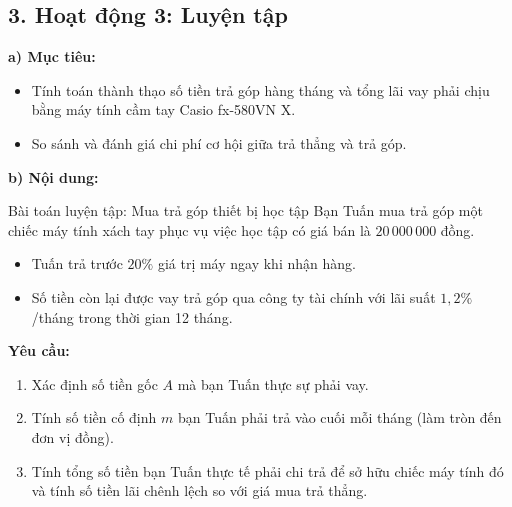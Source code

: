 \documentclass[12pt, a4paper]{article}
\begin{document}
\subsection*{3. Hoạt động 3: Luyện tập}

\noindent \textbf{a) Mục tiêu:}
\begin{itemize}
    \item Tính toán thành thạo số tiền trả góp hàng tháng và tổng lãi vay phải chịu bằng máy tính cầm tay Casio fx-580VN X.
    \item So sánh và đánh giá chi phí cơ hội giữa trả thẳng và trả góp.
\end{itemize}

\noindent \textbf{b) Nội dung:}
\begin{pedabox}{Bài toán luyện tập: Mua trả góp thiết bị học tập}
    Bạn Tuấn mua trả góp một chiếc máy tính xách tay phục vụ việc học tập có giá bán là $20\,000\,000$ đồng.
    \begin{itemize}
        \item Tuấn trả trước $20\%$ giá trị máy ngay khi nhận hàng.
        \item Số tiền còn lại được vay trả góp qua công ty tài chính với lãi suất $1{,}2\%$/tháng trong thời gian 12 tháng.
    \end{itemize}
    \textbf{Yêu cầu:}
    \begin{enumerate}
        \item Xác định số tiền gốc $A$ mà bạn Tuấn thực sự phải vay.
        \item Tính số tiền cố định $m$ bạn Tuấn phải trả vào cuối mỗi tháng (làm tròn đến đơn vị đồng).
        \item Tính tổng số tiền bạn Tuấn thực tế phải chi trả để sở hữu chiếc máy tính đó và tính số tiền lãi chênh lệch so với giá mua trả thẳng.
    \end{enumerate}
\end{pedabox}
\end{document}
